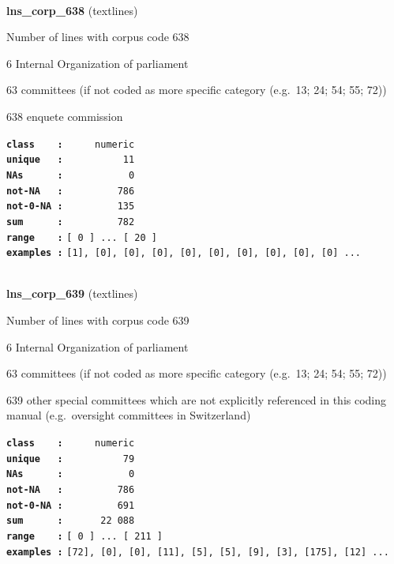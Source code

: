 \documentclass[]{article}
\begin{document}
~

\textbf{lns\_corp\_638} (textlines)

Number of lines with corpus code 638

6 Internal Organization of parliament

63 committees (if not coded as more specific category (e.g.~13; 24; 54;
55; 72))

638 enquete commission

\textbf{\texttt{class\ \ \ \ :}} \texttt{~~~~~numeric}\\
\textbf{\texttt{unique\ \ \ :}} \texttt{~~~~~~~~~~11}\\
\textbf{\texttt{NAs\ \ \ \ \ \ :}} \texttt{~~~~~~~~~~~0}\\
\textbf{\texttt{not-NA\ \ \ :}} \texttt{~~~~~~~~~786}\\
\textbf{\texttt{not-0-NA\ :}} \texttt{~~~~~~~~~135}\\
\textbf{\texttt{sum\ \ \ \ \ \ :}} \texttt{~~~~~~~~~782}\\
\textbf{\texttt{range\ \ \ \ :}}
\texttt{{[}\ 0\ {]}\ ...\ {[}\ 20\ {]}}\\
\textbf{\texttt{examples\ :}}
\texttt{{[}1{]},\ {[}0{]},\ {[}0{]},\ {[}0{]},\ {[}0{]},\ {[}0{]},\ {[}0{]},\ {[}0{]},\ {[}0{]},\ {[}0{]}\ ...}\\

~

\textbf{lns\_corp\_639} (textlines)

Number of lines with corpus code 639

6 Internal Organization of parliament

63 committees (if not coded as more specific category (e.g.~13; 24; 54;
55; 72))

639 other special committees which are not explicitly referenced in this
coding manual (e.g.~oversight committees in Switzerland)

\textbf{\texttt{class\ \ \ \ :}} \texttt{~~~~~numeric}\\
\textbf{\texttt{unique\ \ \ :}} \texttt{~~~~~~~~~~79}\\
\textbf{\texttt{NAs\ \ \ \ \ \ :}} \texttt{~~~~~~~~~~~0}\\
\textbf{\texttt{not-NA\ \ \ :}} \texttt{~~~~~~~~~786}\\
\textbf{\texttt{not-0-NA\ :}} \texttt{~~~~~~~~~691}\\
\textbf{\texttt{sum\ \ \ \ \ \ :}} \texttt{~~~~~~22~088}\\
\textbf{\texttt{range\ \ \ \ :}}
\texttt{{[}\ 0\ {]}\ ...\ {[}\ 211\ {]}}\\
\textbf{\texttt{examples\ :}}
\texttt{{[}72{]},\ {[}0{]},\ {[}0{]},\ {[}11{]},\ {[}5{]},\ {[}5{]},\ {[}9{]},\ {[}3{]},\ {[}175{]},\ {[}12{]}\ ...}\\
\end{document}
